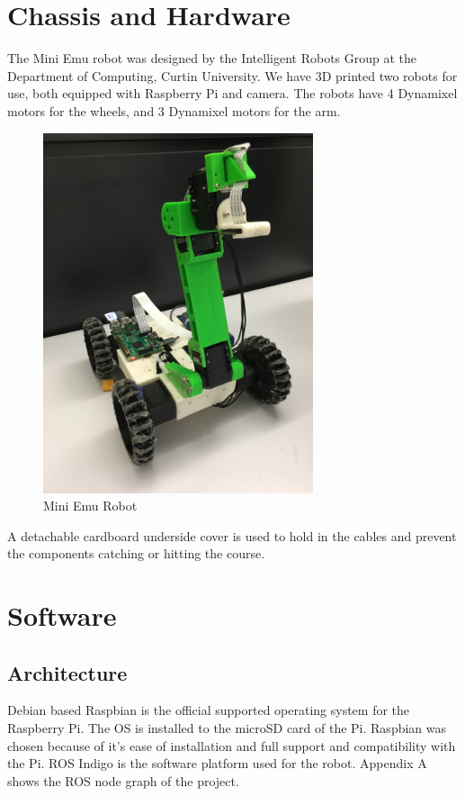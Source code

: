 \documentclass[titlepage,12pt,a4paper]{article}
\begin{document}
\newpage
\section{Chassis and Hardware}
The Mini Emu robot was designed by the Intelligent Robots Group at the Department of Computing, Curtin University. We have 3D printed two robots for use, both equipped with Raspberry Pi and camera. The robots have 4 Dynamixel motors for the wheels, and 3 Dynamixel motors for the arm.\\

\begin{figure}
  \centering
      \includegraphics[height=300pt]{robot}
  \caption{Mini Emu Robot}
  \label{fig:emu}
\end{figure}


\noindent A detachable cardboard underside cover is used to hold in the cables and prevent the components catching or hitting the course.

\newpage
\section{Software}
\subsection{Architecture}
Debian based Raspbian is the official supported operating system for the Raspberry Pi. The OS is installed to the microSD card of the Pi. Raspbian was chosen because of it’s ease of installation and full support and compatibility with the Pi. ROS Indigo is the software platform used for the robot. Appendix A shows the ROS node graph of the project.
\end{document}
